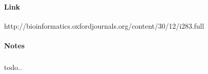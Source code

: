 \documentclass{article}
\begin{document}
		\paragraph{Link\\} http://bioinformatics.oxfordjournals.org/content/30/12/i283.full
		\paragraph{Notes}
		\subparagraph{} todo..
\end{document}

